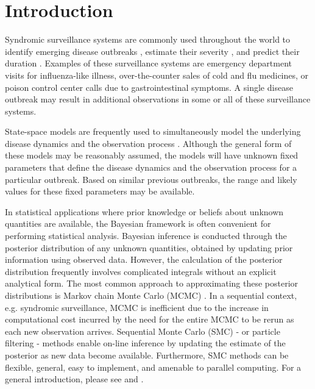 \documentclass{elsarticle}
\begin{document}
\section{Introduction} \label{sec:intro}

Syndromic surveillance systems \citep{henning2004overview, wagner2006biosurveillance, wilson2006synsurveillance, hakenewerth2009north, Gins:Mohe:Pate:Bram:Smol:Bril:dete:2009} are commonly used throughout the world to identify emerging disease outbreaks \citep{neill2006bayesian}, estimate their severity \citep{merl2009statistical}, and predict their duration \cite{ludkovski2010optimal}. Examples of these surveillance systems are emergency department visits for influenza-like illness, over-the-counter sales of cold and flu medicines, or poison control center calls due to gastrointestinal symptoms. A single disease outbreak may result in additional observations in some or all of these surveillance systems.

State-space models are frequently used to simultaneously model the underlying disease dynamics and the observation process \citep{Mart:Cone:Lope:Lope:baye:2008,merl2009statistical,ludkovski2010optimal,skvortsov2012monitoring,unkel2012statistical}. Although the general form of these models may be reasonably assumed, the models will have unknown fixed parameters that define the disease dynamics and the observation process for a particular outbreak. Based on similar previous outbreaks, the range and likely values for these fixed parameters may be available.

In statistical applications where prior knowledge or beliefs about unknown quantities are available, the Bayesian framework is often convenient for performing statistical analysis.  Bayesian inference is conducted through the posterior distribution of any unknown quantities, obtained by updating prior information using observed data. However, the calculation of the posterior distribution frequently involves complicated integrals without an explicit analytical form. The most common approach to approximating these posterior distributions is Markov chain Monte Carlo (MCMC) \citep{Gelf:Smit:samp:1990}. In a sequential context, e.g. syndromic surveillance, MCMC is inefficient due to the increase in computational cost incurred by the need for the entire MCMC to be rerun as each new observation arrives. Sequential Monte Carlo (SMC) - or particle filtering - methods enable on-line inference by updating the estimate of the posterior as new data become available. Furthermore, SMC methods can be flexible, general, easy to implement, and amenable to parallel computing. For a general introduction, please see \cite{Douc:deFr:Gord:sequ:2001} and \cite{cappe2007overview}.
\end{document}
